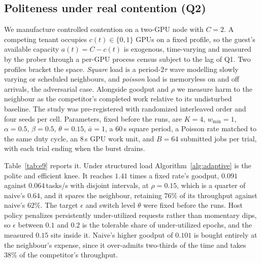 \subsection{Politeness under real contention (Q2)}
\label{sec:eval-contended}
We manufacture controlled contention on a two-GPU node with $C{=}2$. A competing tenant occupies
$c(t)\in\{0,1\}$ GPUs on a fixed profile, so the guest's available capacity
$a(t)=C-c(t)$ is exogenous, time-varying and measured by the prober through a
per-GPU process census subject to the lag of Q1. Two profiles bracket the
space. \emph{Square} load is a period-$2\tau$ wave modelling slowly varying or
scheduled neighbours, and \emph{poisson} load is memoryless on and off arrivals,
the adversarial case. Alongside goodput and $\rho$ we measure harm to the
neighbour as the competitor's completed work relative to its undisturbed baseline.
The study was pre-registered with randomized interleaved order and four seeds per
cell. Parameters, fixed before the runs, are $K{=}4$, $w_{\min}{=}1$,
$\alpha{=}0.5$, $\beta{=}0.5$, $\theta{=}0.15$, $\bar a{=}1$, a $60$\,s square
period, a Poisson rate matched to the same duty cycle, an $8$\,s GPU work unit,
and $B{=}64$ submitted jobs per trial, with each trial ending when the burst
drains.

Table~\ref{tab:e9} reports it. Under structured load Algorithm~\ref{alg:adaptive} is the polite and efficient
knee. It reaches $1.41$ times a fixed rate's goodput, $0.091$ against
$0.064$\,tasks/s with disjoint intervals, at $\rho=0.15$, which is a quarter of
naive's $0.64$, and it spares the neighbour, retaining $76\%$ of its throughput
against naive's $62\%$. The target $\epsilon$ and switch level $\theta$ were fixed
before the runs. Host policy penalizes persistently under-utilized requests rather
than momentary dips, so $\epsilon$ between $0.1$ and $0.2$ is the tolerable share
of under-utilized epochs, and the measured $0.15$ sits inside it. Naive's higher
goodput of $0.101$ is bought entirely at the neighbour's expense, since it
over-admits two-thirds of the time and takes $38\%$ of the competitor's
throughput.

